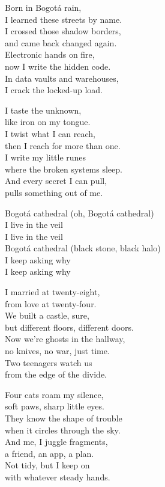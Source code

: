 \begin{lyrics}
Born in Bogotá rain,\\
I learned these streets by name.\\
I crossed those shadow borders,\\
and came back changed again.\\
Electronic hands on fire,\\
now I write the hidden code.\\
In data vaults and warehouses,\\
I crack the locked-up load.

I taste the unknown,\\
like iron on my tongue.\\
I twist what I can reach,\\
then I reach for more than one.\\
I write my little runes\\
where the broken systems sleep.\\
And every secret I can pull,\\
pulls something out of me.

Bogotá cathedral
(oh, Bogotá cathedral)\\
I live in the veil\\
I live in the veil\\
Bogotá cathedral
(black stone, black halo)\\
I keep asking why\\
I keep asking why

I married at twenty-eight,\\
from love at twenty-four.\\
We built a castle, sure,\\
but different floors, different doors.\\
Now we’re ghosts in the hallway,\\
no knives, no war, just time.\\
Two teenagers watch us\\
from the edge of the divide.

Four cats roam my silence,\\
soft paws, sharp little eyes.\\
They know the shape of trouble\\
when it circles through the sky.\\
And me, I juggle fragments,\\
a friend, an app, a plan.\\
Not tidy, but I keep on\\
with whatever steady hands.


\end{lyrics}
